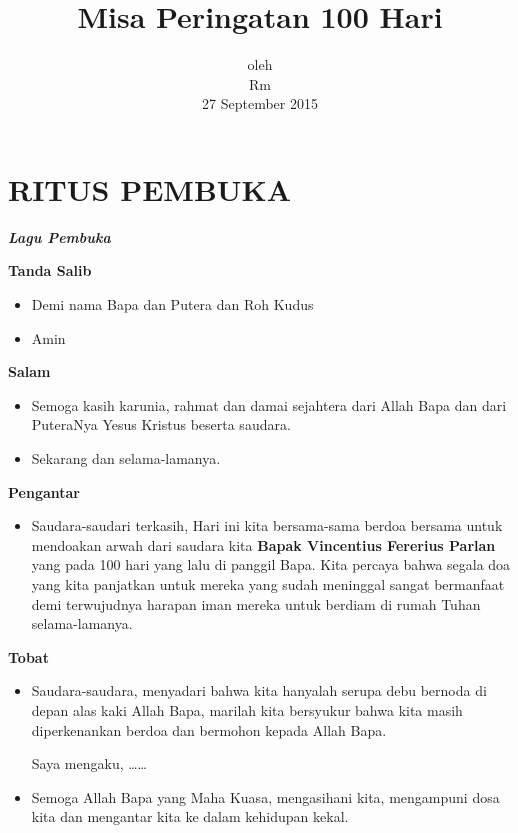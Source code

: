 \documentclass[titlepage,10pt,openany]{scrbook}
\title{Misa Peringatan 100 Hari}
\author{\namaalm}
\date{oleh \\ Rm \namaromo\\27 September 2015}
\makeatletter
\newcommand{\subjudul}[1]{%
  {\parindent \z@ 
    \interlinepenalty\@M \bfseries #1\par\nobreak \vskip 10\p@ }}
\newcommand{\lagu}[1]{%
  {\parindent \z@ 
    \interlinepenalty\@M \slshape \bfseries \normalsize \textit{#1}\par\nobreak \vskip 10\p@ }}
\newcommand{\BU}[1]{\begin{itemize} \item[U:] #1 \end{itemize}}
\newcommand{\BI}[1]{\begin{itemize} \item[I:] #1 \end{itemize}}
\newcommand{\namaalm}{Bapak Vincentius Fererius Parlan }
\newcommand{\namaromo}{Wagiman Wigyo Sumantara Pr.}
\makeatother
\begin{document}
\thispagestyle{empty}



\section*{RITUS PEMBUKA} 

 

\lagu{Lagu Pembuka}  
 

\subjudul{Tanda Salib} 

\BI{Demi nama  Bapa dan Putera dan Roh Kudus}

\BU{Amin}

 

\subjudul{Salam}

\BI{Semoga kasih karunia, rahmat dan damai sejahtera dari 
Allah Bapa dan dari PuteraNya Yesus Kristus beserta 
saudara.} 

\BU{Sekarang dan selama-lamanya.}

 

\subjudul{Pengantar}

\BI{Saudara-saudari terkasih,
Hari ini kita bersama-sama berdoa bersama untuk
mendoakan arwah dari saudara kita \textbf{\namaalm} yang pada 100
hari yang lalu di panggil Bapa. Kita percaya bahwa segala
doa yang kita panjatkan untuk mereka yang sudah
meninggal sangat bermanfaat demi terwujudnya harapan
iman mereka untuk berdiam di rumah Tuhan selama-lamanya.}


\subjudul{Tobat}

\BI{Saudara-saudara, menyadari bahwa kita hanyalah serupa 
debu bernoda di depan alas kaki Allah Bapa, marilah kita 
bersyukur bahwa kita masih diperkenankan berdoa dan 
bermohon kepada Allah Bapa. 

Saya mengaku, \ldots \ldots
} 



\BI{Semoga Allah Bapa yang Maha Kuasa, mengasihani kita, 
mengampuni dosa kita dan mengantar kita ke dalam 
kehidupan kekal.}
\end{document}
